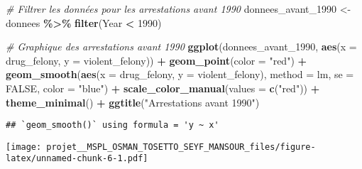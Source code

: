 \documentclass[
]{article}
\newenvironment{Shaded}{\begin{snugshade}}{\end{snugshade}}
\newcommand{\AttributeTok}[1]{\textcolor[rgb]{0.13,0.29,0.53}{#1}}
\newcommand{\CommentTok}[1]{\textcolor[rgb]{0.56,0.35,0.01}{\textit{#1}}}
\newcommand{\ConstantTok}[1]{\textcolor[rgb]{0.56,0.35,0.01}{#1}}
\newcommand{\DecValTok}[1]{\textcolor[rgb]{0.00,0.00,0.81}{#1}}
\newcommand{\FunctionTok}[1]{\textcolor[rgb]{0.13,0.29,0.53}{\textbf{#1}}}
\newcommand{\NormalTok}[1]{#1}
\newcommand{\OtherTok}[1]{\textcolor[rgb]{0.56,0.35,0.01}{#1}}
\newcommand{\SpecialCharTok}[1]{\textcolor[rgb]{0.81,0.36,0.00}{\textbf{#1}}}
\newcommand{\StringTok}[1]{\textcolor[rgb]{0.31,0.60,0.02}{#1}}
\begin{document}
\begin{Shaded}
\begin{Highlighting}[]
\CommentTok{\# Filtrer les données pour les arrestations avant 1990}
\NormalTok{donnees\_avant\_1990 }\OtherTok{\textless{}{-}}\NormalTok{ donnees }\SpecialCharTok{\%\textgreater{}\%} \FunctionTok{filter}\NormalTok{(Year }\SpecialCharTok{\textless{}} \DecValTok{1990}\NormalTok{)}

\CommentTok{\# Graphique des arrestations avant 1990}
\FunctionTok{ggplot}\NormalTok{(donnees\_avant\_1990, }\FunctionTok{aes}\NormalTok{(}\AttributeTok{x =}\NormalTok{ drug\_felony, }\AttributeTok{y =}\NormalTok{ violent\_felony)) }\SpecialCharTok{+} 
  \FunctionTok{geom\_point}\NormalTok{(}\AttributeTok{color =} \StringTok{"red"}\NormalTok{) }\SpecialCharTok{+}
  \FunctionTok{geom\_smooth}\NormalTok{(}\FunctionTok{aes}\NormalTok{(}\AttributeTok{x =}\NormalTok{ drug\_felony, }\AttributeTok{y =}\NormalTok{ violent\_felony), }\AttributeTok{method =}\NormalTok{ lm, }\AttributeTok{se =} \ConstantTok{FALSE}\NormalTok{, }\AttributeTok{color =} \StringTok{"blue"}\NormalTok{) }\SpecialCharTok{+}
  \FunctionTok{scale\_color\_manual}\NormalTok{(}\AttributeTok{values =} \FunctionTok{c}\NormalTok{(}\StringTok{"red"}\NormalTok{)) }\SpecialCharTok{+}
  \FunctionTok{theme\_minimal}\NormalTok{() }\SpecialCharTok{+}
  \FunctionTok{ggtitle}\NormalTok{(}\StringTok{"Arrestations avant 1990"}\NormalTok{)}
\end{Highlighting}
\end{Shaded}

\begin{verbatim}
## `geom_smooth()` using formula = 'y ~ x'
\end{verbatim}

\texttt{[image: projet\_\_MSPL\_OSMAN\_TOSETTO\_SEYF\_MANSOUR\_files/figure-latex/unnamed-chunk-6-1.pdf]}
\end{document}

